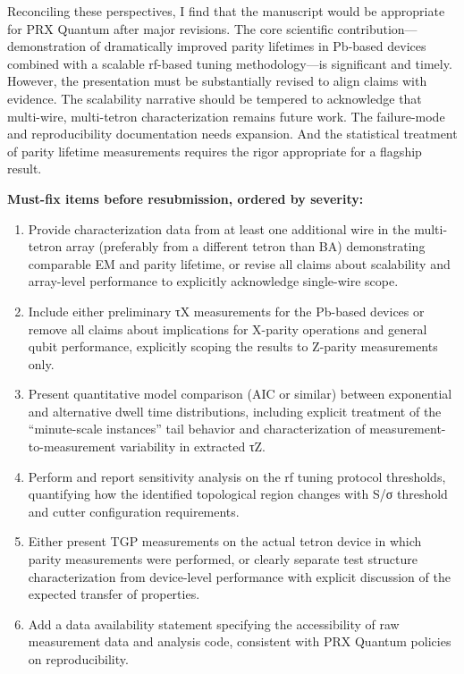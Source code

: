 \documentclass[10pt,letterpaper]{article}
\begin{document}
Reconciling these perspectives, I find that the manuscript would be appropriate for PRX Quantum after major revisions. The core scientific contribution---demonstration of dramatically improved parity lifetimes in Pb-based devices combined with a scalable rf-based tuning methodology---is significant and timely. However, the presentation must be substantially revised to align claims with evidence. The scalability narrative should be tempered to acknowledge that multi-wire, multi-tetron characterization remains future work. The failure-mode and reproducibility documentation needs expansion. And the statistical treatment of parity lifetime measurements requires the rigor appropriate for a flagship result.

\textbf{Must-fix items before resubmission, ordered by severity:}

\begin{enumerate}
\def\labelenumi{\arabic{enumi}.}
\item
  Provide characterization data from at least one additional wire in the multi-tetron array (preferably from a different tetron than BA) demonstrating comparable EM and parity lifetime, or revise all claims about scalability and array-level performance to explicitly acknowledge single-wire scope.
\item
  Include either preliminary τX measurements for the Pb-based devices or remove all claims about implications for X-parity operations and general qubit performance, explicitly scoping the results to Z-parity measurements only.
\item
  Present quantitative model comparison (AIC or similar) between exponential and alternative dwell time distributions, including explicit treatment of the ``minute-scale instances'' tail behavior and characterization of measurement-to-measurement variability in extracted τZ.
\item
  Perform and report sensitivity analysis on the rf tuning protocol thresholds, quantifying how the identified topological region changes with S/σ threshold and cutter configuration requirements.
\item
  Either present TGP measurements on the actual tetron device in which parity measurements were performed, or clearly separate test structure characterization from device-level performance with explicit discussion of the expected transfer of properties.
\item
  Add a data availability statement specifying the accessibility of raw measurement data and analysis code, consistent with PRX Quantum policies on reproducibility.
\end{enumerate}
\end{document}
